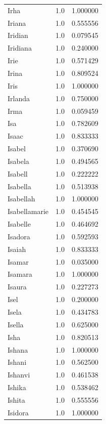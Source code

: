 \documentclass[
  letterpaper,
  DIV=11,
  numbers=noendperiod]{scrreprt}
\begin{document}
\begin{tabular}{lrr}
Irha            &   1.0 &   1.000000 \\
Iriana          &   1.0 &   0.555556 \\
Iridian         &   1.0 &   0.079545 \\
Iridiana        &   1.0 &   0.240000 \\
Irie            &   1.0 &   0.571429 \\
Irina           &   1.0 &   0.809524 \\
Iris            &   1.0 &   1.000000 \\
Irlanda         &   1.0 &   0.750000 \\
Irma            &   1.0 &   0.059459 \\
Isa             &   1.0 &   0.782609 \\
Isaac           &   1.0 &   0.833333 \\
Isabel          &   1.0 &   0.370690 \\
Isabela         &   1.0 &   0.494565 \\
Isabell         &   1.0 &   0.222222 \\
Isabella        &   1.0 &   0.513938 \\
Isabellah       &   1.0 &   1.000000 \\
Isabellamarie   &   1.0 &   0.454545 \\
Isabelle        &   1.0 &   0.464692 \\
Isadora         &   1.0 &   0.592593 \\
Isaiah          &   1.0 &   0.833333 \\
Isamar          &   1.0 &   0.035000 \\
Isamara         &   1.0 &   1.000000 \\
Isaura          &   1.0 &   0.227273 \\
Isel            &   1.0 &   0.200000 \\
Isela           &   1.0 &   0.434783 \\
Isella          &   1.0 &   0.625000 \\
Isha            &   1.0 &   0.820513 \\
Ishana          &   1.0 &   1.000000 \\
Ishani          &   1.0 &   0.562500 \\
Ishanvi         &   1.0 &   0.461538 \\
Ishika          &   1.0 &   0.538462 \\
Ishita          &   1.0 &   0.555556 \\
Isidora         &   1.0 &   1.000000 \\

\end{tabular}
\end{document}
